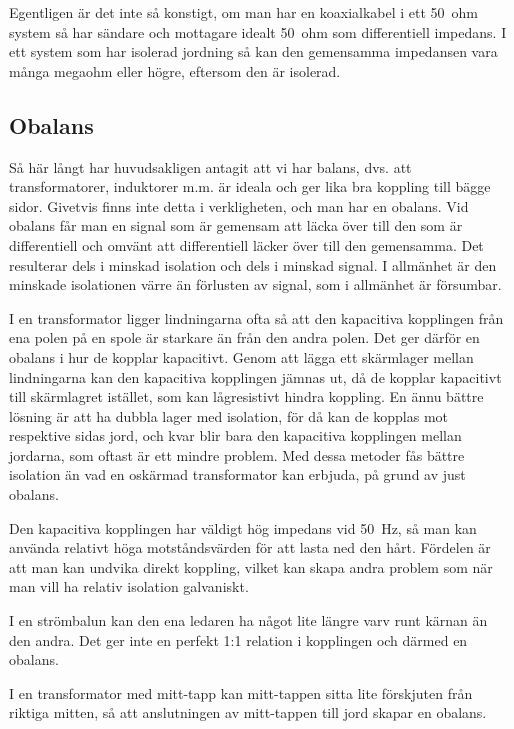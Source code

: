 Egentligen är det inte så konstigt, om man har en koaxialkabel i ett 50~ohm
system så har sändare och mottagare idealt 50~ohm som differentiell impedans.
I ett system som har isolerad jordning så kan den gemensamma impedansen vara
många megaohm eller högre, eftersom den är isolerad.

\subsection{Obalans}

Så här långt har huvudsakligen antagit att vi har balans, dvs. att
transformatorer, induktorer m.m. är ideala och ger lika bra koppling till bägge
sidor.
Givetvis finns inte detta i verkligheten, och man har en obalans.
Vid obalans får man en signal som är gemensam att läcka över till den som är
differentiell och omvänt att differentiell läcker över till den gemensamma.
Det resulterar dels i minskad isolation och dels i minskad signal.
I allmänhet är den minskade isolationen värre än förlusten av signal, som i
allmänhet är försumbar.

I en transformator ligger lindningarna ofta så att den kapacitiva kopplingen
från ena polen på en spole är starkare än från den andra polen.
Det ger därför en obalans i hur de kopplar kapacitivt.
Genom att lägga ett skärmlager mellan lindningarna kan den kapacitiva
kopplingen jämnas ut, då de kopplar kapacitivt till skärmlagret istället,
som kan lågresistivt hindra koppling.
En ännu bättre lösning är att ha dubbla lager med isolation, för då
kan de kopplas mot respektive sidas jord, och kvar blir bara den kapacitiva
kopplingen mellan jordarna, som oftast är ett mindre problem.
Med dessa metoder fås bättre isolation än vad en oskärmad transformator kan
erbjuda, på grund av just obalans.

Den kapacitiva kopplingen har väldigt hög impedans vid 50~Hz, så man kan
använda relativt höga motståndsvärden för att lasta ned den hårt.
Fördelen är att man kan undvika direkt koppling, vilket kan skapa andra
problem som när man vill ha relativ isolation galvaniskt.

I en strömbalun kan den ena ledaren ha något lite längre varv runt kärnan än
den andra.
Det ger inte en perfekt 1:1 relation i kopplingen och därmed en obalans.

I en transformator med mitt-tapp kan mitt-tappen sitta lite förskjuten från
riktiga mitten, så att anslutningen av mitt-tappen till jord skapar en
obalans.

